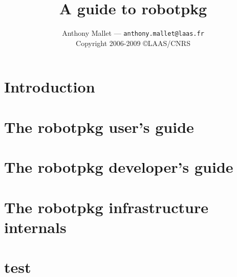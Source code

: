 \documentclass[a4paper,11pt]{book}
\title{A guide to robotpkg}
\author{
   Anthony Mallet --- {\tt anthony.mallet@laas.fr}\\[1em]
   Copyright 2006-2009 \copyright LAAS/CNRS
}
\begin{document}

\frontmatter
\maketitle
\tableofcontents
\mainmatter

\chapter{Introduction}
\label{chapter:introduction}


\chapter{The robotpkg user's guide}
\label{chapter:user}


%

\chapter{The robotpkg developer's guide}
\label{chapter:developer}

\chapter{The robotpkg infrastructure internals}
\label{chapter:internal}
\chapter{test}
\end{document}
